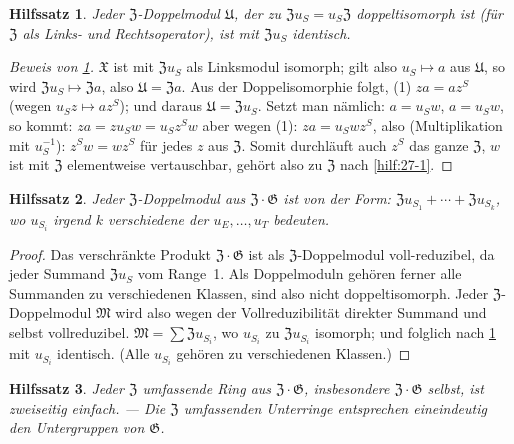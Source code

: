 \documentclass[12pt,a4paper]{article}
\theoremstyle{plain}
\newtheorem{hilfssatz}{Hilfssatz}[section]
\theoremstyle{definition}
\theoremstyle{remark}
\begin{document}
\begin{hilfssatz}\label{hilf:27-2}
Jeder $\mathfrak{Z}$-Doppelmodul $\mathfrak{U}$, der zu $\mathfrak{Z}u_{S} = u_{S}\mathfrak{Z}$
doppeltisomorph ist (f\"ur $\mathfrak{Z}$ als Links- und Rechtsoperator), ist mit
$\mathfrak{Z}u_{S}$ identisch.
\end{hilfssatz}

\begin{proof}[Beweis von \ref{hilf:27-2}]
$\mathfrak{X}$ ist mit $\mathfrak{Z}u_{S}$ als Linksmodul isomorph; gilt also
$u_{S} \mapsto a$ aus $\mathfrak{U}$, so wird $\mathfrak{Z}u_{S} \mapsto \mathfrak{Z}a$, also
$\mathfrak{U} = \mathfrak{Z}a$. Aus der Doppelisomorphie folgt, (1) $za = az^{S}$
(wegen $u_{S}z \mapsto az^{S}$); und daraus $\mathfrak{U} = \mathfrak{Z}u_{S}$. Setzt man
n\"amlich: $a = u_{S}w$, $a = u_{S}w$, so kommt:
$za = zu_{S}w = u_{S}z^{S}w$ aber wegen (1): $za = u_{S}wz^{S}$,
also (Multiplikation mit $u_{S}^{-1}$): $z^{S}w = wz^{S}$ f\"ur jedes $z$
aus $\mathfrak{Z}$. Somit durchl\"auft auch $z^{S}$ das ganze $\mathfrak{Z}$, $w$ ist mit
$\mathfrak{Z}$ elementweise vertauschbar, geh\"ort also zu $\mathfrak{Z}$ nach \ref{hilf:27-1}.
\end{proof}

\begin{hilfssatz}\label{hilf:27-3}
Jeder $\mathfrak{Z}$-Doppelmodul aus $\mathfrak{Z} \cdot \mathfrak{G}$ ist von der Form:
$\mathfrak{Z}u_{S_{1}} + \cdots + \mathfrak{Z}u_{S_{k}}$, wo $u_{S_{i}}$ irgend $k$
verschiedene der $u_{E}, \ldots, u_{T}$ bedeuten.
\end{hilfssatz}

\begin{proof}
Das verschr\"ankte Produkt $\mathfrak{Z} \cdot \mathfrak{G}$ ist als $\mathfrak{Z}$-Doppelmodul
voll-reduzibel, da jeder Summand $\mathfrak{Z}u_{S}$ vom Range~1. Als
Doppelmoduln geh\"oren ferner alle Summanden zu verschiedenen
Klassen, sind also nicht doppeltisomorph. Jeder $\mathfrak{Z}$-Doppelmodul
$\mathfrak{M}$ wird also wegen der Vollreduzibilit\"at direkter Summand und
selbst vollreduzibel. $\mathfrak{M} = \sum \mathfrak{Z}u_{S_{i}}$, wo $u_{S_{i}}$ zu
$\mathfrak{Z}u_{S_{i}}$ isomorph; und folglich nach \ref{hilf:27-2} mit
$u_{S_{i}}$ identisch. (Alle $u_{S_{i}}$ geh\"oren zu verschiedenen Klassen.)
\end{proof}

\begin{hilfssatz}\label{hilf:27-4}
Jeder $\mathfrak{Z}$ umfassende Ring aus $\mathfrak{Z} \cdot \mathfrak{G}$, insbesondere
$\mathfrak{Z} \cdot \mathfrak{G}$ selbst, ist zweiseitig einfach. --- Die $\mathfrak{Z}$
umfassenden Unterringe entsprechen eineindeutig den Untergruppen von
$\mathfrak{G}$.
\end{hilfssatz}
\end{document}
